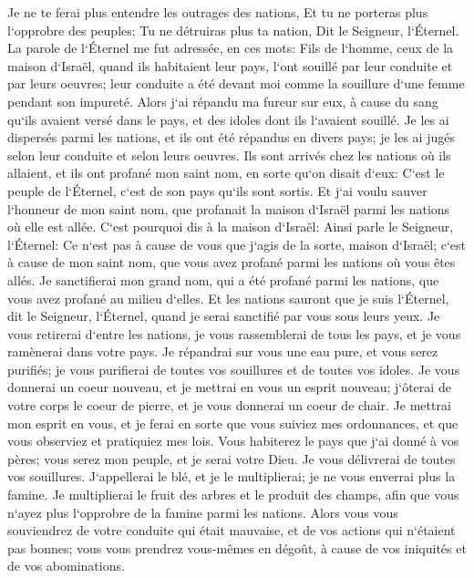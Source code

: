 \verse Je ne te ferai plus entendre les outrages des nations, Et tu ne porteras plus l`opprobre des peuples; Tu ne détruiras plus ta nation, Dit le Seigneur, l`Éternel. 
\verse La parole de l`Éternel me fut adressée, en ces mots: 
\verse Fils de l`homme, ceux de la maison d`Israël, quand ils habitaient leur pays, l`ont souillé par leur conduite et par leurs oeuvres; leur conduite a été devant moi comme la souillure d`une femme pendant son impureté. 
\verse Alors j`ai répandu ma fureur sur eux, à cause du sang qu`ils avaient versé dans le pays, et des idoles dont ils l`avaient souillé. 
\verse Je les ai dispersés parmi les nations, et ils ont été répandus en divers pays; je les ai jugés selon leur conduite et selon leurs oeuvres. 
\verse Ils sont arrivés chez les nations où ils allaient, et ils ont profané mon saint nom, en sorte qu`on disait d`eux: C`est le peuple de l`Éternel, c`est de son pays qu`ils sont sortis. 
\verse Et j`ai voulu sauver l`honneur de mon saint nom, que profanait la maison d`Israël parmi les nations où elle est allée. 
\verse C`est pourquoi dis à la maison d`Israël: Ainsi parle le Seigneur, l`Éternel: Ce n`est pas à cause de vous que j`agis de la sorte, maison d`Israël; c`est à cause de mon saint nom, que vous avez profané parmi les nations où vous êtes allés. 
\verse Je sanctifierai mon grand nom, qui a été profané parmi les nations, que vous avez profané au milieu d`elles. Et les nations sauront que je suis l`Éternel, dit le Seigneur, l`Éternel, quand je serai sanctifié par vous sous leurs yeux. 
\verse Je vous retirerai d`entre les nations, je vous rassemblerai de tous les pays, et je vous ramènerai dans votre pays. 
\verse Je répandrai sur vous une eau pure, et vous serez purifiés; je vous purifierai de toutes vos souillures et de toutes vos idoles. 
\verse Je vous donnerai un coeur nouveau, et je mettrai en vous un esprit nouveau; j`ôterai de votre corps le coeur de pierre, et je vous donnerai un coeur de chair. 
\verse Je mettrai mon esprit en vous, et je ferai en sorte que vous suiviez mes ordonnances, et que vous observiez et pratiquiez mes lois. 
\verse Vous habiterez le pays que j`ai donné à vos pères; vous serez mon peuple, et je serai votre Dieu. 
\verse Je vous délivrerai de toutes vos souillures. J`appellerai le blé, et je le multiplierai; je ne vous enverrai plus la famine. 
\verse Je multiplierai le fruit des arbres et le produit des champs, afin que vous n`ayez plus l`opprobre de la famine parmi les nations. 
\verse Alors vous vous souviendrez de votre conduite qui était mauvaise, et de vos actions qui n`étaient pas bonnes; vous vous prendrez vous-mêmes en dégoût, à cause de vos iniquités et de vos abominations. 
